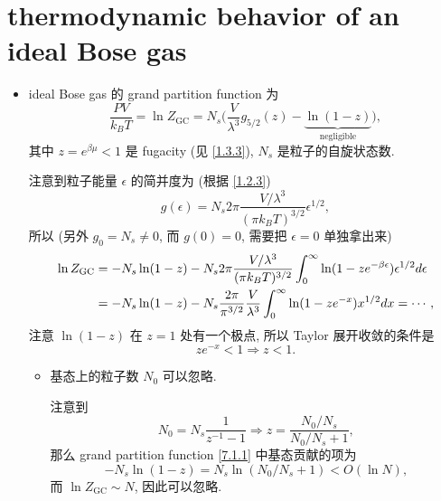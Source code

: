 \section{thermodynamic behavior of an ideal Bose gas} \label{7.1}
\begin{itemize}
	\item ideal Bose gas 的 grand partition function 为
	\begin{equation} \label{7.1.1}
		\frac{P V}{k_B T} = \ln Z_\text{GC} = N_s \Big( \frac{V}{\lambda^3} g_{5 / 2}(z) - \underbrace{\ln(1 - z)}_{\text{negligible}} \Big),
	\end{equation}
	其中 $z = e^{\beta \mu} < 1$ 是 fugacity (见 \eqref{1.3.3}), $N_s$ 是粒子的自旋状态数.
	
	\begin{tcolorbox}[title=calculation:]
		注意到粒子能量 $\epsilon$ 的简并度为 (根据 \eqref{1.2.3})
		\begin{equation}
			g(\epsilon) = N_s 2 \pi \frac{V / \lambda^3}{(\pi k_B T)^{3 / 2}} \epsilon^{1 / 2},
		\end{equation}
		所以 (另外 $g_0 = N_s \neq 0$, 而 $g(0) = 0$, 需要把 $\epsilon = 0$ 单独拿出来)
		\begin{align}
			\ln Z_\text{GC} &= - N_s \ln(1 - z) - N_s 2 \pi \frac{V / \lambda^3}{(\pi k_B T)^{3 / 2}} \int_0^\infty \ln(1 - z e^{- \beta \epsilon}) \epsilon^{1 / 2} d\epsilon \notag \\
			&= - N_s \ln(1 - z) - N_s \frac{2 \pi}{\pi^{3 / 2}} \frac{V}{\lambda^3} \int_0^\infty \ln(1 - z e^{- x}) x^{1 / 2} dx = \cdots,
		\end{align}
		注意 $\ln(1 - z)$ 在 $z = 1$ 处有一个极点, 所以 Taylor 展开收敛的条件是
		\begin{equation} \label{7.1.4}
			z e^{- x} < 1 \Longrightarrow z < 1.
		\end{equation}
	\end{tcolorbox}
	
	\begin{itemize}
		\item 基态上的粒子数 $N_0$ 可以忽略.
		
		\begin{tcolorbox}[title=proof:]
			注意到
			\begin{equation}
				N_0 = N_s \frac{1}{z^{- 1} - 1} \Longrightarrow z = \frac{N_0 / N_s}{N_0 / N_s + 1},
			\end{equation}
			那么 grand partition function \eqref{7.1.1} 中基态贡献的项为
			\begin{equation}
				- N_s \ln(1 - z) = N_s \ln(N_0 / N_s + 1) < O(\ln N),
			\end{equation}
			而 $\ln Z_\text{GC} \sim N$, 因此可以忽略.
		\end{tcolorbox}
	\end{itemize}
	

\end{itemize}
